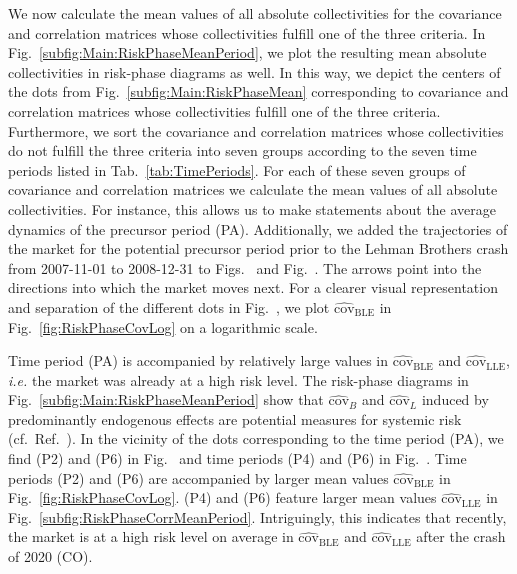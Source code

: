 \documentclass[aps, pra, groupedaddress, showkeys, twocolumn, floatfix, 10pt]{revtex4-2}
\newcommand*\meanNONDiag[1]{\widehat{#1}}
\begin{document}
We now calculate the mean values of all absolute collectivities for the covariance and correlation matrices 
whose collectivities fulfill one of the three criteria.
In Fig.~\ref{subfig:Main:RiskPhaseMeanPeriod}, we plot the resulting mean absolute collectivities in risk-phase diagrams as well.
In this way, we depict the centers of the dots
from Fig.~\ref{subfig:Main:RiskPhaseMean} corresponding to covariance and correlation matrices whose collectivities fulfill one of the three criteria.
Furthermore, we sort the covariance and correlation matrices whose collectivities do not fulfill the three criteria into
seven groups according to the seven time periods listed in Tab.~\ref{tab:TimePeriods}.
For each of these seven groups of covariance and correlation matrices we calculate the mean values of all absolute collectivities.
For instance, this allows us to make statements about the average dynamics 
of the precursor period (PA).
Additionally, we added the trajectories of the market for the potential precursor period prior to the Lehman Brothers crash from \mbox{2007-11-01} to \mbox{2008-12-31} to Figs.~ and Fig.~.
The arrows point into the directions into which the market moves next.
For a clearer visual representation and separation
 of the different dots in Fig.~, we plot $\meanNONDiag{\text{cov}}_{\text{BLE}}$ in Fig.~\ref{fig:RiskPhaseCovLog} on a logarithmic scale. 

Time period (PA) is accompanied by relatively large values in $\meanNONDiag{\text{cov}}_{\text{BLE}}$
and  $\meanNONDiag{\text{cov}}_{\text{LLE}}$, \textit{i.e.} the market was already at a high risk level.
The risk-phase diagrams in Fig.~\ref{subfig:Main:RiskPhaseMeanPeriod} show that $\meanNONDiag{\text{cov}}_{{B}}$ and $\meanNONDiag{\text{cov}}_{{L}}$ induced by predominantly endogenous effects are potential measures for systemic risk (cf.~Ref.~\cite{Heckens_2022}).
In the vicinity of the dots corresponding to the time period (PA), we find (P2) and (P6) in Fig.~ and
time periods (P4) and (P6) in Fig.~. Time periods (P2) and (P6) are accompanied by larger mean values $\meanNONDiag{\text{cov}}_{\text{BLE}}$ in Fig.~\ref{fig:RiskPhaseCovLog}. (P4) and (P6) feature larger mean values $\meanNONDiag{\text{cov}}_{\text{LLE}}$ in Fig.~\ref{subfig:RiskPhaseCorrMeanPeriod}.
Intriguingly, this indicates that recently, the market is at a high risk level on average in $\meanNONDiag{\text{cov}}_{\text{BLE}}$
and  $\meanNONDiag{\text{cov}}_{\text{LLE}}$ after the crash of 2020 (CO).
\end{document}
